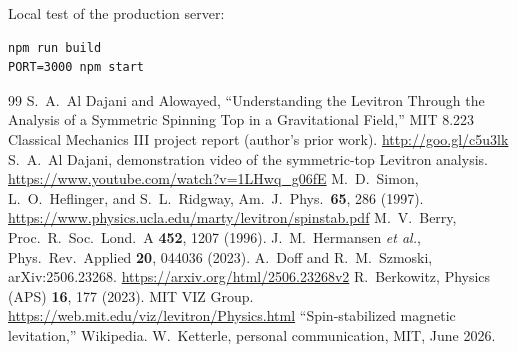 \documentclass[aapm,ajp,amsmath,amssymb,reprint]{revtex4-2}
\begin{document}
Local test of the production server:
\begin{verbatim}
npm run build
PORT=3000 npm start
\end{verbatim}

\begin{thebibliography}{99}
 S.~A.~Al Dajani and Alowayed, ``Understanding the Levitron Through the Analysis of a Symmetric Spinning Top in a Gravitational Field,'' MIT 8.223 Classical Mechanics III project report (author's prior work). \url{http://goo.gl/c5u3lk}
 S.~A.~Al Dajani, demonstration video of the symmetric-top Levitron analysis. \url{https://www.youtube.com/watch?v=1LHwq_g06fE}
 M.~D.~Simon, L.~O.~Heflinger, and S.~L.~Ridgway, Am.\ J.\ Phys.\ \textbf{65}, 286 (1997). \url{https://www.physics.ucla.edu/marty/levitron/spinstab.pdf}
 M.~V.~Berry, Proc.\ R.\ Soc.\ Lond.\ A \textbf{452}, 1207 (1996).
 J.~M.~Hermansen \textit{et al.}, Phys.\ Rev.\ Applied \textbf{20}, 044036 (2023).
 A.~Doff and R.~M.~Szmoski, arXiv:2506.23268. \url{https://arxiv.org/html/2506.23268v2}
 R.~Berkowitz, Physics (APS) \textbf{16}, 177 (2023).
 MIT VIZ Group. \url{https://web.mit.edu/viz/levitron/Physics.html}
 ``Spin-stabilized magnetic levitation,'' Wikipedia.
 W.~Ketterle, personal communication, MIT, June 2026.
\end{thebibliography}
\end{document}
